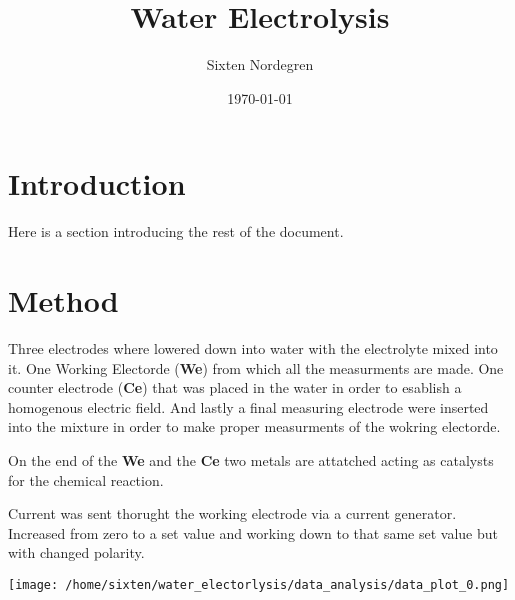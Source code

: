\documentclass[twocolumn]{revtex4-2}
\begin{document}
\title{Water Electrolysis}
\author{Sixten Nordegren}

\date{\today}

\maketitle
\section{Introduction}
Here is a section introducing the rest of the document.
\section{Method}
Three electrodes where lowered down into water with the electrolyte mixed into it.
One Working Electorde (\textbf{We}) from which all the measurments are made. One counter
electrode (\textbf{Ce}) that was placed in the water in order to esablish a 
homogenous electric field. And lastly a final measuring electrode were inserted
into the mixture in order to make proper measurments of the wokring electorde.

On the end of the \textbf{We} and the \textbf{Ce} two metals are attatched acting 
as catalysts for the chemical reaction. 

Current was sent thorught the working electrode via a current generator. Increased
from zero to a set value and working down to that same set value but with changed 
polarity.

\texttt{[image: /home/sixten/water\_electorlysis/data\_analysis/data\_plot\_0.png]}
\end{document}
